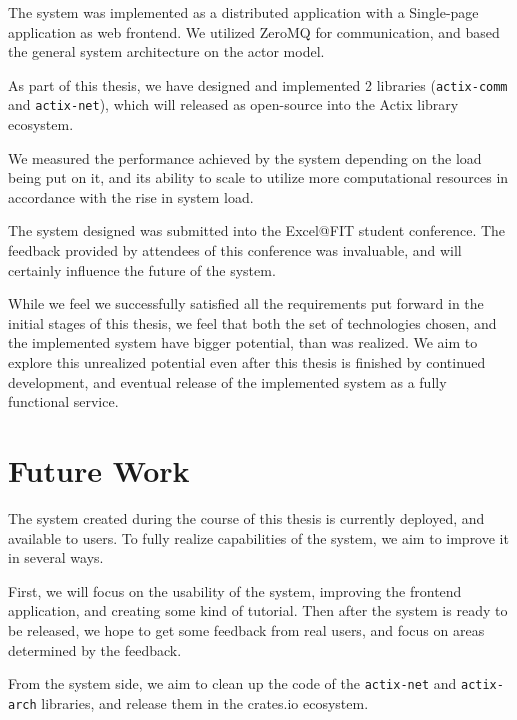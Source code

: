 The system was implemented as a distributed application with a Single-page application as web frontend. We utilized
ZeroMQ for communication, and based the general system architecture on the actor model.

As part of this thesis, we have designed and implemented 2 libraries (\verb|actix-comm| and \verb|actix-net|), which
will released as open-source into the Actix library ecosystem.

We measured the performance achieved by the system depending on the load being put on it, and its ability to scale to
utilize more computational resources in accordance with the rise in system load.

The system designed was submitted into the Excel@FIT student conference. The feedback provided by attendees of this
conference was invaluable, and will certainly influence the future of the system.

While we feel we successfully satisfied all the requirements put forward in the initial stages of this thesis,
we feel that both the set of technologies chosen, and the implemented system have bigger potential, than was
realized. We aim to explore this unrealized potential even after this thesis is finished by continued development,
and eventual release of the implemented system as a fully functional service.


\section*{Future Work}
The system created during the course of this thesis is currently deployed, and available to users.
To fully realize capabilities of the system, we aim to improve it in several ways.

First, we will focus on the usability of the system, improving the frontend application, and creating some kind of
tutorial. Then after the system is ready to be released, we hope to get some feedback from real users, and
focus on areas determined by the feedback.

From the system side, we aim to clean up the code of the \verb|actix-net| and \verb|actix-arch| libraries,
and release them in the crates.io ecosystem.

